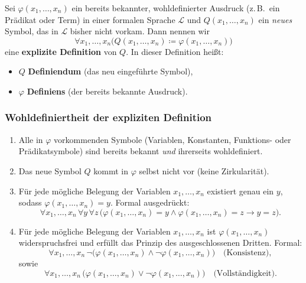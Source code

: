 \documentclass[main.tex]{subfiles}
\begin{document}
\begin{definition}
Sei \(\varphi(x_1,\dots,x_n)\) ein bereits bekannter, wohldefinierter Ausdruck (z.\,B.\ ein Prädikat oder Term) in einer formalen Sprache \(\mathcal{L}\) und \(Q(x_1,\dots,x_n)\) ein \emph{neues} Symbol, das in \(\mathcal{L}\) bisher nicht vorkam. Dann nennen wir
\[
\forall x_1,\dots,x_n \bigl( Q(x_1,\dots,x_n) \coloneqq \varphi(x_1,\dots,x_n) \bigr)
\]
eine \textbf{explizite Definition} von \(Q\). In dieser Definition heißt:
\begin{itemize}
    \item \(Q\) \textbf{Definiendum} (das neu eingeführte Symbol),
    \item \(\varphi\) \textbf{Definiens} (der bereits bekannte Ausdruck).
\end{itemize}

\noindent
\subsubsection{Wohldefiniertheit der expliziten Definition} 
\begin{enumerate}
    \item Alle in \(\varphi\) vorkommenden Symbole (Variablen, Konstanten, Funktions- oder Prädikatsymbole) sind bereits bekannt \emph{und} ihrerseits wohldefiniert.
    \item Das neue Symbol \(Q\) kommt in \(\varphi\) selbst nicht vor (keine Zirkularität).
    \item Für jede mögliche Belegung der Variablen \(x_1,\dots,x_n\) existiert genau ein \(y\), sodass \(\varphi(x_1,\dots,x_n) = y\). Formal ausgedrückt:
    \[
    \forall x_1,\dots,x_n \, \forall y \, \forall z \, \bigl( \varphi(x_1,\dots,x_n) = y \land \varphi(x_1,\dots,x_n) = z \rightarrow y = z \bigr).
    \]
    \item Für jede mögliche Belegung der Variablen \(x_1, \dots, x_n\) ist \(\varphi(x_1,\dots,x_n)\) widerspruchsfrei und erfüllt das Prinzip des ausgeschlossenen Dritten. Formal:
    \[
    \forall x_1,\dots,x_n \, \neg \bigl( \varphi(x_1,\dots,x_n) \land \neg \varphi(x_1,\dots,x_n) \bigr) \quad \text{(Konsistenz)},
    \]
    sowie
    \[
    \forall x_1,\dots,x_n \, \bigl( \varphi(x_1,\dots,x_n) \lor \neg \varphi(x_1,\dots,x_n) \bigr) \quad \text{(Vollständigkeit)}.
    \]
\end{enumerate}
\end{definition}
\end{document}
